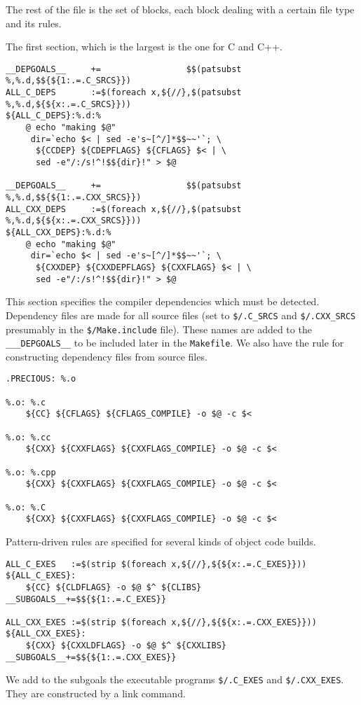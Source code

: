 \documentclass{article}
\begin{document}
The rest of the file is the set of blocks, each block dealing with
a certain file type and its rules.

The first section, which is the largest is the one for C and C++.
\begin{verbatim}
__DEPGOALS__     +=                 $$(patsubst %,%.d,$${${1:.=.C_SRCS}})
ALL_C_DEPS       :=$(foreach x,${//},$(patsubst %,%.d,${${x:.=.C_SRCS}}))
${ALL_C_DEPS}:%.d:%
	@ echo "making $@"
	 dir=`echo $< | sed -e's~[^/]*$$~~'`; \
	  ${CCDEP} ${CDEPFLAGS} ${CFLAGS} $< | \
	  sed -e"/:/s!^!$${dir}!" > $@

__DEPGOALS__     +=                 $$(patsubst %,%.d,$${${1:.=.CXX_SRCS}})
ALL_CXX_DEPS     :=$(foreach x,${//},$(patsubst %,%.d,${${x:.=.CXX_SRCS}}))
${ALL_CXX_DEPS}:%.d:%
	@ echo "making $@"
	 dir=`echo $< | sed -e's~[^/]*$$~~'`; \
	  ${CXXDEP} ${CXXDEPFLAGS} ${CXXFLAGS} $< | \
	  sed -e"/:/s!^!$${dir}!" > $@
\end{verbatim}
This section specifies the compiler dependencies which must be
detected.  Dependency files are made for all source files
(set to \verb+$/.C_SRCS+ and \verb+$/.CXX_SRCS+ presumably in
the \verb+$/Make.include+ file).  These
names are added to the \verb+___DEPGOALS__+ to be included later
in the \verb+Makefile+.  We also have the rule for constructing
dependency files from source files.

\begin{verbatim}
.PRECIOUS: %.o

%.o: %.c
	${CC} ${CFLAGS} ${CFLAGS_COMPILE} -o $@ -c $<

%.o: %.cc
	${CXX} ${CXXFLAGS} ${CXXFLAGS_COMPILE} -o $@ -c $<

%.o: %.cpp
	${CXX} ${CXXFLAGS} ${CXXFLAGS_COMPILE} -o $@ -c $<

%.o: %.C
	${CXX} ${CXXFLAGS} ${CXXFLAGS_COMPILE} -o $@ -c $<
\end{verbatim}
Pattern-driven rules are specified for several kinds of
object code builds.

\begin{verbatim}
ALL_C_EXES   :=$(strip $(foreach x,${//},${${x:.=.C_EXES}}))
${ALL_C_EXES}:
	${CC} ${CLDFLAGS} -o $@ $^ ${CLIBS}
__SUBGOALS__+=$${${1:.=.C_EXES}}

ALL_CXX_EXES :=$(strip $(foreach x,${//},${${x:.=.CXX_EXES}}))
${ALL_CXX_EXES}:
	${CXX} ${CXXLDFLAGS} -o $@ $^ ${CXXLIBS}
__SUBGOALS__+=$${${1:.=.CXX_EXES}}
\end{verbatim}
We add to the subgoals the executable programs \verb+$/.C_EXES+ and
\verb+$/.CXX_EXES+.  They are constructed by a link command.
\end{document}
